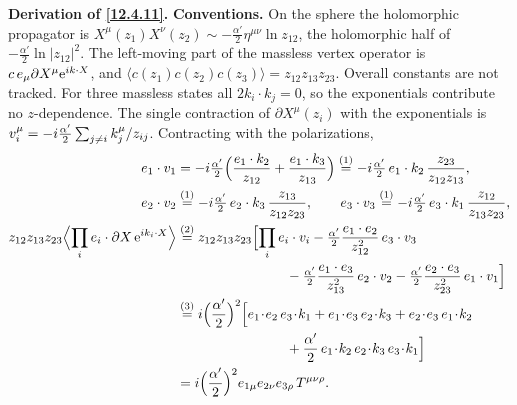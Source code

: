 \begin{tcolorbox}[breakable]
	\begin{remark}
		\textbf{Derivation of \eqref{12.4.11}.} \textbf{Conventions.} On the sphere the holomorphic propagator is $X^{\mu}(z_{1})X^{\nu}(z_{2})\sim-\frac{\alpha'}{2}\eta^{\mu\nu}\ln z_{12}$, the holomorphic half of $-\frac{\alpha'}{2}\ln|z_{12}|^{2}$. The left-moving part of the massless vertex operator is $c\,e_{\mu}\partial X^{\mu}\mathrm{e}^{i k\cdot X}$, and $\langle c(z_{1})c(z_{2})c(z_{3})\rangle=z_{12}z_{13}z_{23}$. Overall constants are not tracked. For three massless states all $2k_{i}\cdot k_{j}=0$, so the exponentials contribute no $z$-dependence. The single contraction of $\partial X^{\mu}(z_{i})$ with the exponentials is $v_{i}^{\mu}=-i\frac{\alpha'}{2}\sum_{j\neq i}k_{j}^{\mu}/z_{ij}$. Contracting with the polarizations,
		\begin{align*}
			e_{1}\cdot v_{1}&=-\mi\tfrac{\alpha'}{2}\Bigl(\frac{e_{1}\cdot k_{2}}{z_{12}}+\frac{e_{1}\cdot k_{3}}{z_{13}}\Bigr)\eqs{1} -\mi\tfrac{\alpha'}{2}\,e_{1}\cdot k_{2}\,\frac{z_{23}}{z_{12}z_{13}} ,\\
			e_{2}\cdot v_{2}&\eqs{1} -\mi\tfrac{\alpha'}{2}\,e_{2}\cdot k_{3}\,\frac{z_{13}}{z_{12}z_{23}} ,\qquad
			e_{3}\cdot v_{3}\eqs{1} -\mi\tfrac{\alpha'}{2}\,e_{3}\cdot k_{1}\,\frac{z_{12}}{z_{13}z_{23}} ,\\
			z_{12}z_{13}z_{23}\Bigl\langle\prod_{i}e_{i}\cdot\partial X\,\me^{\mi k_{i}\cdot X}\Bigr\rangle
			&\eqs{2} z_{12}z_{13}z_{23}\Bigl[\prod_{i}e_{i}\cdot v_{i}-\tfrac{\alpha'}{2}\frac{e_{1}\cdot e_{2}}{z_{12}^{2}}\,e_{3}\cdot v_{3}\\
			&\hspace{8em}-\tfrac{\alpha'}{2}\frac{e_{1}\cdot e_{3}}{z_{13}^{2}}\,e_{2}\cdot v_{2}-\tfrac{\alpha'}{2}\frac{e_{2}\cdot e_{3}}{z_{23}^{2}}\,e_{1}\cdot v_{1}\Bigr]\\
			&\eqs{3} \mi\Bigl(\frac{\alpha'}{2}\Bigr)^{2}\Bigl[e_{1}\!\cdot\! e_{2}\,e_{3}\!\cdot\! k_{1}+e_{1}\!\cdot\! e_{3}\,e_{2}\!\cdot\! k_{3}+e_{2}\!\cdot\! e_{3}\,e_{1}\!\cdot\! k_{2}\\
			&\hspace{8em}+\frac{\alpha'}{2}\,e_{1}\!\cdot\! k_{2}\,e_{2}\!\cdot\! k_{3}\,e_{3}\!\cdot\! k_{1}\Bigr]\\
			&=\mi\Bigl(\frac{\alpha'}{2}\Bigr)^{2}e_{1\mu}e_{2\nu}e_{3\rho}\,T^{\mu\nu\rho} .
		\end{align*}

\end{remark}
\end{tcolorbox}
